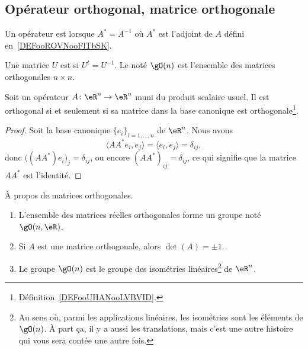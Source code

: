 \subsection{Opérateur orthogonal, matrice orthogonale}

\begin{definition}      \label{DEFooYKCSooURQDoS}
	Un opérateur est  lorsque \( A^*=A^{-1}\) où \( A^*\) est l'adjoint de \( A\) défini en~\ref{DEFooROVNooFlTbSK}.
\end{definition}

\begin{definition}      \label{DEFooUHANooLVBVID}
	Une matrice \( U\) est  si \( U^t=U^{-1}\). Le  noté \( \gO(n)\) est l'ensemble des matrices orthogonales \( n\times n\).
\end{definition}

\begin{lemma}       \label{LEMooSSALooSBFzJb}
	Soit un opérateur \( A\colon \eR^n\to \eR^n\) muni du produit scalaire usuel. Il est orthogonal si et seulement si sa matrice dans la base canonique est orthogonale\footnote{Définition~\ref{DEFooUHANooLVBVID}.}.
\end{lemma}

\begin{proof}
	Soit la base canonique \( \{ e_i \}_{i=1,\ldots, n}\) de \( \eR^n\). Nous avons
	\begin{equation}
		\langle AA^*e_i, e_j\rangle =\langle e_i, e_j\rangle =\delta_{ij},
	\end{equation}
	donc \( \big( (AA^*)e_i \big)_j=\delta_{ij}\), ou encore \( (AA^*)_{ij}=\delta_{ij}\), ce qui signifie que la matrice \( AA^*\) est l'identité.
\end{proof}

\begin{proposition}     \label{PropKBCXooOuEZcS}
	À propos de matrices orthogonales.
	\begin{enumerate}
		\item       \label{ITEMooHSTAooIbVrwa}
		      L'ensemble des matrices réelles orthogonales forme un groupe noté \( \gO(n,\eR)\).
		\item
		      Si \( A\) est une matrice orthogonale, alors \( \det(A)=\pm 1\).
		\item       \label{ITEMooOWMBooHUatNb}
		      Le groupe \( \gO(n)\) est le groupe des isométries linéaires\footnote{Au sens où, parmi les applications linéaires, les isométries sont les éléments de \( \gO(n)\). À part ça, il y a aussi les translations, mais c'est une autre histoire qui vous sera contée une autre fois.} de \( \eR^n\).
	\end{enumerate}
\end{proposition}

